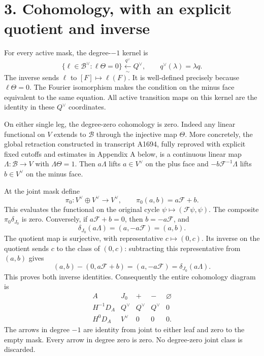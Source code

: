 \section{3. Cohomology, with an explicit quotient and
inverse}\label{proof03:cohomology-with-an-explicit-quotient-and-inverse}

For every active mask, the degree-\(-1\) kernel is \[
\{\ell\in\mathscr B^\vee:\ell\Theta=0\}
\xleftarrow[\sim]{q^\vee}Q^\vee,
\qquad q^\vee(\lambda)=\lambda q.
\] The inverse sends \(\ell\) to \([F]\mapsto\ell(F)\). It is
well-defined precisely because \(\ell\Theta=0\). The Fourier isomorphism
makes the condition on the minus face equivalent to the same equation.
All active transition maps on this kernel are the identity in these
\(Q^\vee\) coordinates.

On either single leg, the degree-zero cohomology is zero. Indeed any
linear functional on \(V\) extends to \(\mathscr B\) through the
injective map \(\Theta\). More concretely, the global retraction
constructed in transcript A1694, fully reproved with explicit fixed
cutoffs and estimates in Appendix A below, is a continuous linear map
\(\Lambda:\mathscr B\to V\) with \(\Lambda\Theta=1\). Then \(a\Lambda\)
lifts \(a\in V^\vee\) on the plus face and \(-b\mathcal F^{-1}\Lambda\)
lifts \(b\in V^\vee\) on the minus face.

At the joint mask define \[
\pi_0:V^\vee\oplus V^\vee\longrightarrow V^\vee,
\qquad\pi_0(a,b)=a\mathcal F+b.
\] This evaluates the functional on the original cycle
\(\psi\mapsto(\mathcal F\psi,\psi)\). The composite
\(\pi_0\delta_{J_0}\) is zero. Conversely, if \(a\mathcal F+b=0\), then
\(b=-a\mathcal F\), and \[
\delta_{J_0}(a\Lambda)=(a,-a\mathcal F)=(a,b).
\] The quotient map is surjective, with representative
\(c\mapsto(0,c)\). Its inverse on the quotient sends \(c\) to the class
of \((0,c)\): subtracting this representative from \((a,b)\) gives \[
(a,b)-(0,a\mathcal F+b)=(a,-a\mathcal F)=\delta_{J_0}(a\Lambda).
\] This proves both inverse identities. Consequently the entire
cohomology diagram is \[
\begin{array}{c|cccc}
A&J_0&+&-&\varnothing\\ \hline
H^{-1}D_A&Q^\vee&Q^\vee&Q^\vee&0\\
H^0D_A&V^\vee&0&0&0.
\end{array}
\] The arrows in degree \(-1\) are identity from joint to either leaf
and zero to the empty mask. Every arrow in degree zero is zero. No
degree-zero joint class is discarded.

